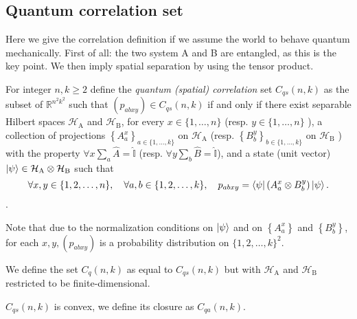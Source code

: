 \subsection{Quantum correlation set}
Here we give the correlation definition if we assume the world to behave quantum mechanically. First of all: the two system A and B are entangled, as this is the key point. We then imply spatial separation by using the tensor product.


\begin{defn}
    For integer $n, k \geq 2$ define the \emph{quantum (spatial) correlation} set $C_{q s}(n, k)$ as the subset of $\mathbb{R}^{n^{2} k^{2}}$ such that $\left(p_{a b x y}\right) \in C_{q s}(n, k)$ if and only if there exist separable Hilbert spaces $\mathcal{H}_{\mathrm{A}}$ and $\mathcal{H}_{\mathrm{B}}$, for every $x \in\{1, \ldots, n\}$ (resp. $y \in\{1, \ldots, n\}$ ), a collection of projections $\left\{A_{a}^{x}\right\}_{a \in\{1, \ldots, k\}}$ on $\mathcal{H}_{\mathrm{A}}$ (resp. $\left\{B_{b}^{y}\right\}_{b \in\{1, \ldots, k\}}$ on $\mathcal{H}_{\mathrm{B}}$ ) with the property $\forall x \sum_a{\hat{A}} = \hat{\mathbb{I}}$ (resp. $\forall y \sum_b{\hat{B}} = \hat{\mathbb{I}}$), and a state (unit vector) $\ket{\psi} \in \mathcal{H}_{\mathrm{A}} \otimes \mathcal{H}_{\mathrm{B}}$ such that
    \begin{equation}
    \forall x, y \in\{1,2, \ldots, n\}, \quad \forall a, b \in\{1,2, \ldots, k\}, \quad p_{a b x y}=\bra{\psi}\left(A_{a}^{x} \otimes B_{b}^{y}\right) \ket{\psi} .
    \end{equation}.
\end{defn}

Note that due to the normalization conditions on $\ket{\psi}$ and on $\left\{A_{a}^{x}\right\}$ and $\left\{B_{b}^{y}\right\}$, for each $x, y,\left(p_{a b x y}\right)$ is a probability distribution on $\{1,2, \ldots, k\}^{2}$. 

\begin{defn}
We define the set $C_{q}(n, k)$ as equal to $C_{q s}(n, k)$ but with $\mathcal{H}_{\mathrm{A}}$ and $\mathcal{H}_{\mathrm{B}}$ restricted to be finite-dimensional.
\end{defn}

\begin{defn}
    $C_{q s}(n, k)$ is convex, we define its closure as $C_{q a}(n, k)$.
\end{defn}
